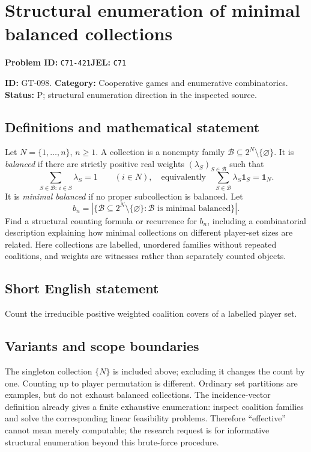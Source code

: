 \documentclass[11pt,a4paper]{article}
\begin{document}
\section*{Structural enumeration of minimal balanced collections}
\textbf{Problem ID:} \texttt{C71-421}\quad \textbf{JEL:} \texttt{C71}\par
\label{problem:OP-0228}
\label{game:GT-098}
{\sffamily\small\color{muted}
\noindent\textbf{ID:} GT-098. \textbf{Category:} Cooperative games and enumerative combinatorics.
\textbf{Status:} P; structural enumeration direction in the inspected source.
\par}
\subsection*{Definitions and mathematical statement}
Let $N=\{1,\ldots,n\}$, $n\geq1$. A collection is a nonempty family
$\mathcal B\subseteq2^N\setminus\{\varnothing\}$. It is \emph{balanced} if there are strictly positive real weights $(\lambda_S)_{S\in\mathcal B}$ such that
\[
 \sum_{S\in\mathcal B:\ i\in S}\lambda_S=1\qquad(i\in N),
 \quad\text{equivalently}\quad
 \sum_{S\in\mathcal B}\lambda_S\mathbf1_S=\mathbf1_N.
\]
It is \emph{minimal balanced} if no proper subcollection is balanced. Let
\[
 b_n=\left|\{\mathcal B\subseteq2^N\setminus\{\varnothing\}:
                         \mathcal B\text{ is minimal balanced}\}\right|.
\]
Find a structural counting formula or recurrence for $b_n$, including a combinatorial description explaining how minimal collections on different player-set sizes are related. Here collections are labelled, unordered families without repeated coalitions, and weights are witnesses rather than separately counted objects.

\subsection*{Short English statement}
Count the irreducible positive weighted coalition covers of a labelled player set.

\subsection*{Variants and scope boundaries}
The singleton collection $\{N\}$ is included above; excluding it changes the count by one. Counting up to player permutation is different. Ordinary set partitions are examples, but do not exhaust balanced collections. The incidence-vector definition already gives a finite exhaustive enumeration: inspect coalition families and solve the corresponding linear feasibility problems. Therefore ``effective'' cannot mean merely computable; the research request is for informative structural enumeration beyond this brute-force procedure.
\end{document}
